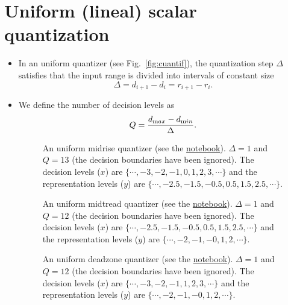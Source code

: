 \section{Uniform (lineal) scalar quantization}
\begin{itemize}

\item
  In an uniform quantizer (see Fig.~\ref{fig:cuantif}), the
  quantization step \(\Delta\) satisfies that the input range is
  divided into intervals of constant size
  \begin{equation}
    \Delta=d_{i+1}-d_i=r_{i+1}-r_i.
  \end{equation}
\item We define the number of decision levels as
  \begin{equation}
    Q=\frac{d_{\text max}-d_{\text min}}{\Delta}.
    \label{eq:delta_definition}
  \end{equation}

  \begin{figure}
    \caption{An uniform midrise quantizer (see the
      \href{https://nbviewer.jupyter.org/github/vicente-gonzalez-ruiz/quantization/blob/master/graphics/midrise.ipynb}{notebook}). $\Delta=1$
      and $Q=13$ (the decision boundaries have been ignored). The
      decision levels ($x$) are $\{\cdots,-3,-2,-1,0,1,2,3,\cdots\}$
      and the representation levels ($y$) are
      $\{\cdots,-2.5,-1.5,-0.5,0.5,1.5,2.5,\cdots\}$.}
    \label{fig:midrise}
  \end{figure}
  
  \begin{figure}
    \caption{An uniform midtread quantizer (see the
      \href{https://nbviewer.jupyter.org/github/vicente-gonzalez-ruiz/quantization/blob/master/graphics/midtread.ipynb}{notebook}). $\Delta=1$
      and $Q=12$ (the decision boundaries have been ignored). The
      decision levels ($x$) are $\{\cdots,-2.5,-1.5,-0.5,0.5,1.5,2.5,\cdots\}$
      and the representation levels ($y$) are
      $\{\cdots,-2,-1,-0,1,2,\cdots\}$.}
    \label{fig:midtread}
  \end{figure}

  \begin{figure}
    \caption{An uniform deadzone quantizer (see the
      \href{https://nbviewer.jupyter.org/github/vicente-gonzalez-ruiz/quantization/blob/master/graphics/deadzone.ipynb}{notebook}). $\Delta=1$
      and $Q=12$ (the decision boundaries have been ignored). The
      decision levels ($x$) are $\{\cdots,-3,-2,-1,1,2,3,\cdots\}$
      and the representation levels ($y$) are
      $\{\cdots,-2,-1,-0,1,2,\cdots\}$.}
    \label{fig:deadzone}
  \end{figure}


\end{itemize}
